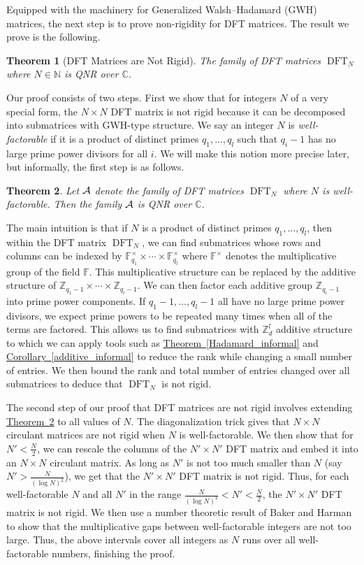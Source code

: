 \documentclass[11pt]{article}
\numberwithin{equation}{section}
\newtheorem{theorem}{Theorem}[section]
\theoremstyle{definition}
\theoremstyle{plain}
\newcommand{\C}{\mathbb C}
\newcommand{\Z}{\mathbb Z}
\newcommand{\N}{\mathbb N}
\newcommand{\expref}[2]{\hyperref[#2]{#1~\ref{#2}}}
\theoremstyle{definition}
\newcommand\F{{\mathbb{F}}}
\renewcommand\Z{{\mathbb{Z}}}
\renewcommand\N{{\mathbb{N}}}
\renewcommand\C{{\mathbb{C}}}
\DeclareMathOperator{\DFT}{DFT}
\begin{document}
Equipped with the machinery for
Generalized Walsh--Hadamard (GWH) matrices,
the next step is to prove non-rigidity for DFT 
matrices.  The result we prove is the following.
\begin{theorem}[DFT Matrices are Not Rigid]\label{fullFourier_intro}
The family of DFT matrices $\DFT_N$
where $N \in \N$ is QNR over $\C$.
\end{theorem} 
Our proof consists of two steps.  First we show that for integers $N$ of a very special form, the $N \times N$ DFT 
 matrix is not rigid because it can be decomposed into submatrices with 
GWH-type structure.  We say an integer $N$ is
\emph{well-factorable}  %
%
if it is a product of distinct primes $q_1, \dots , q_l$ such that %
$q_i - 1$ has no large prime power divisors for all $i$.
%
%
We will make this notion more precise later, but informally, the first step is
as follows. 
\begin{theorem} \label{main_informal}
Let $\cal A$ denote the family of DFT matrices $\DFT_N$
 where $N$ is well-factorable.  Then the family $\cal A$ is QNR over $\C$.
\end{theorem}
The main intuition is that if $N$ is a product of distinct primes
$q_1, \dots , q_l$, then within the DFT matrix $\DFT_N$,
we can find submatrices whose rows and columns can be indexed by
$\F_{q_1}^{\times} \times \cdots \times \F_{q_l}^{\times}$ where
$\F^{\times}$ denotes the multiplicative group of the field $\F$.
This multiplicative structure can be replaced by the additive structure of $\Z_{q_1-1} \times \cdots \times \Z_{q_l-1}$.  We can then factor each additive group $\Z_{q_i-1}$ into prime power components.  If $q_1-1, \dots , q_l-1$ all have no large prime power divisors, we expect prime powers to be repeated many times when all of the terms are factored. This allows us to find submatrices with $\Z_d^l$ additive structure
%
to  %
which we can apply tools such as \expref{Theorem}{Hadamard_informal} and \expref{Corollary}{additive_informal} to reduce the rank while changing a small number of entries.  We then bound the rank and total number of entries changed over all submatrices to deduce that $\DFT_N$ is not rigid.

The second step of our proof that DFT
matrices are not rigid involves extending \expref{Theorem}{main_informal} to all values of $N$. The diagonalization trick gives that $N \times N$ circulant matrices are not rigid when $N$ is well-factorable.  We then show that for $N' < \frac{N}{2}$, we can rescale the columns of the $N' \times N'$ DFT 
 matrix and embed it into an $N \times N$ circulant matrix.  As long as $N'$ is not too much smaller than $N$ (say $N' > \frac{N}{(\log N)^2}$), we get that the $N' \times N'$ DFT 
 matrix is not rigid.  Thus, for each well-factorable $N$ and all $N'$ in the range $\frac{N}{(\log N)^2} < N' < \frac{N}{2}$, the $N' \times N'$ DFT 
matrix is not rigid.  We then use a number theoretic result of
Baker and Harman  %
\cite{smooth_primes} to show that the
%
%
%
multiplicative gaps  %
between well-factorable integers are not too large. Thus, the above intervals cover all integers as $N$ runs over all well-factorable numbers, finishing the proof.   
\end{document}
